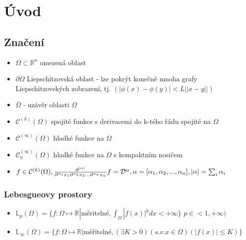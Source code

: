 \documentclass[../main.tex]{subfiles}
\begin{document}
\section{Úvod}

\subsection{Značení}



\begin{itemize}
    \item $\Omega \subset \mathbb{R}^n$ omezená oblast

    \item $\partial\Omega$ Liepschitzovská oblast - lze pokrýt konečně mnoha grafy Liepschitzovských zobrazení, tj. $(|\phi(x) -  \phi(y)| < L ||x-y||)$

    \item $\bar{\Omega}$ - uzávěr oblasti $\Omega$

    \item $\mathcal{C}^{(k)}(\Omega)$ spojité funkce s derivacemi do k-tého řádu spojité na $\Omega$

    \item $\mathcal{C}^{(\infty)}(\Omega)$ hladké funkce na $\Omega$

    \item $\mathcal{C}^{(\infty)}_0(\Omega)$ hladké funkce na $\Omega$ s kompaktním nosičem


    \item $f\in\mathcal{C}^{(k)}(\Omega), \frac{\partial^{|\alpha|}}{\partial^{\alpha_1}x_1\partial^{\alpha_2}x_2...\partial^{\alpha_n}x_n} f = \mathcal{D}^\alpha, \alpha = [\alpha_1, \alpha_2, ..., \alpha_n], |\alpha|=\sum_i \alpha_i $
\end{itemize}



\subsubsection*{Lebesgueovy prostory}

\begin{itemize}
    \item $\mathbb{L}_p(\Omega) = \{f: \Omega \mapsto \mathbb{R}| \text{měritelné}, \int_{\Omega}|f(x)|^p dx < +\infty \}$
$p \in <1, +\infty)$

\item $\mathbb{L}_\infty(\Omega) = \{  f:\Omega\mapsto\mathbb{R} | \text{měřitelné}, (\exists K > 0)(s.v. x \in\Omega)(|f(x)| \leq K)  \}$
\end{itemize}
\end{document}
